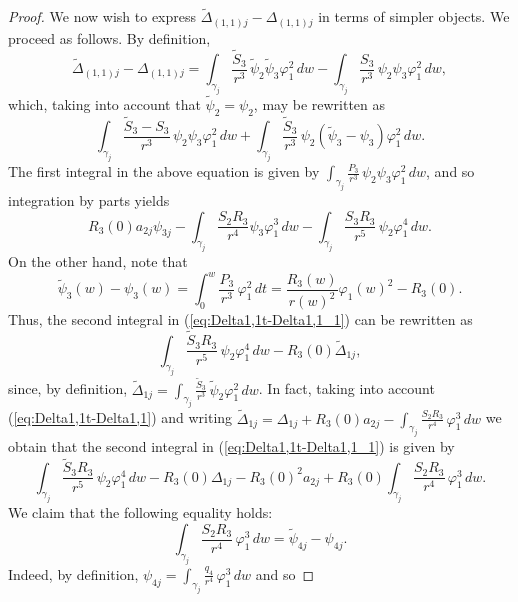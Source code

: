 \begin{proof}
We now wish to express $\widetilde{\Delta}_{(1,1)j}-\Delta_{(1,1)j}$ in terms of simpler objects. We proceed as follows. By definition,
\[ \widetilde{\Delta}_{(1,1)j}-\Delta_{(1,1)j} = \int_{\gamma_j}\frac{\widetilde{S}_3}{r^3}\,\tilde{\psi}_2\tilde{\psi}_3\varphi_1^2\,dw-\int_{\gamma_j}\frac{S_3}{r^3}\,\psi_2\psi_3\varphi_1^2\,dw,\]
which, taking into account that $\tilde{\psi}_2=\psi_2$, may be rewritten as
\begin{equation}\label{eq:Delta1,1t-Delta1,1_1}
\int_{\gamma_j}\frac{\widetilde{S}_3-S_3}{r^3}\,\psi_2\psi_3\varphi_1^2\,dw +\int_{\gamma_j}\frac{\widetilde{S}_3}{r^3}\,\psi_2(\tilde{\psi}_3-\psi_3)\varphi_1^2\,dw.
\end{equation}
The first integral in the above equation is given by $\int_{\gamma_j}\frac{P_3}{r^3}\,\psi_2\psi_3\varphi_1^2\,dw$, and so integration by parts yields
\begin{equation}\label{eq:Delta1,1t-Delta1,1_2}
R_3(0)a_{2j}\psi_{3j}-\int_{\gamma_j}\frac{S_2R_3}{r^4}\psi_3\varphi_1^3\,dw -\int_{\gamma_j}\frac{S_3R_3}{r^5}\,\psi_2\varphi_1^4\,dw.
\end{equation}
On the other hand, note that 
\begin{equation}\label{formula:psi3t-psi3}
 \tilde{\psi}_3(w)-\psi_3(w)=\int_0^w\frac{P_3}{r^3}\,\varphi_1^2\,dt=\frac{R_3(w)}{r(w)^2}\varphi_1(w)^2-R_3(0).
\end{equation}
Thus, the second integral in (\ref{eq:Delta1,1t-Delta1,1_1}) can be rewritten as
\[ \int_{\gamma_j}\frac{\widetilde{S}_3R_3}{r^5}\,\psi_2\varphi_1^4\,dw-R_3(0)\widetilde{\Delta}_{1j}, \]
since, by definition, $\widetilde{\Delta}_{1j}=\int_{\gamma_j}\frac{\widetilde{S}_3}{r^3}\,\tilde{\psi}_2\varphi_1^2\,dw$. In fact, taking into account (\ref{eq:Delta1,1t-Delta1,1}) and writing $\widetilde{\Delta}_{1j}=\Delta_{1j}+R_3(0)a_{2j}-\int_{\gamma_j}\frac{S_2R_3}{r^4}\,\varphi_1^3\,dw$ we obtain that the second integral in (\ref{eq:Delta1,1t-Delta1,1_1}) is given by
\begin{equation}\label{eq:Delta1,1t-Delta1,1_3}
\int_{\gamma_j}\frac{\widetilde{S}_3R_3}{r^5}\,\psi_2\varphi_1^4\,dw -R_3(0)\Delta_{1j}-R_3(0)^2a_{2j}+R_3(0)\int_{\gamma_j}\frac{S_2R_3}{r^4}\,\varphi_1^3\,dw.
\end{equation}
We claim that the following equality holds:
\begin{equation}\label{formula:psi4t-psi4}
 \int_{\gamma_j}\frac{S_2R_3}{r^4}\,\varphi_1^3\,dw=\tilde{\psi}_{4j}-\psi_{4j}. 
\end{equation}
Indeed, by definition, $\psi_{4j}=\int_{\gamma_j}\frac{q_4}{r^4}\,\varphi_1^3\,dw$ and so

\end{proof}
